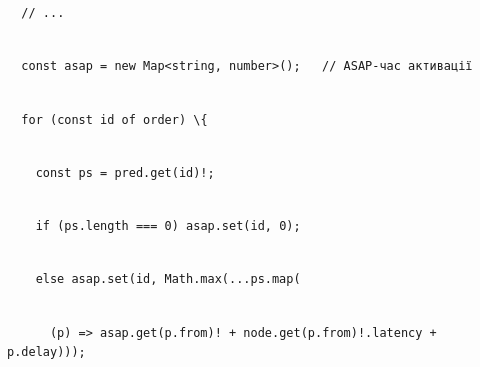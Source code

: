 \documentclass[
]{article}
\newcommand{\passthrough}[1]{#1}
\begin{document}
\passthrough{\lstinline!  !}\passthrough{\lstinline!//!}\passthrough{\lstinline! !}\passthrough{\lstinline!...!}\strut \\
\passthrough{\lstinline!  !}\passthrough{\lstinline!const!}\passthrough{\lstinline! !}\passthrough{\lstinline!asap!}\passthrough{\lstinline! !}\passthrough{\lstinline!=!}\passthrough{\lstinline! !}\passthrough{\lstinline!new!}\passthrough{\lstinline! !}\passthrough{\lstinline!Map<string,!}\passthrough{\lstinline! !}\passthrough{\lstinline!number>();!}\passthrough{\lstinline!   !}\passthrough{\lstinline!//!}\passthrough{\lstinline! !}\passthrough{\lstinline!ASAP-час!}\passthrough{\lstinline! !}\passthrough{\lstinline!активації!}\strut \\
\passthrough{\lstinline!  !}\passthrough{\lstinline!for!}\passthrough{\lstinline! !}\passthrough{\lstinline!(const!}\passthrough{\lstinline! !}\passthrough{\lstinline!id!}\passthrough{\lstinline! !}\passthrough{\lstinline!of!}\passthrough{\lstinline! !}\passthrough{\lstinline!order)!}\passthrough{\lstinline! !}\passthrough{\lstinline!\{!}\strut \\
\passthrough{\lstinline!    !}\passthrough{\lstinline!const!}\passthrough{\lstinline! !}\passthrough{\lstinline!ps!}\passthrough{\lstinline! !}\passthrough{\lstinline!=!}\passthrough{\lstinline! !}\passthrough{\lstinline!pred.get!}\passthrough{\lstinline"(id)!;"}\strut \\
\passthrough{\lstinline!    !}\passthrough{\lstinline!if!}\passthrough{\lstinline! !}\passthrough{\lstinline!(!}\passthrough{\lstinline!ps.length!}\passthrough{\lstinline! !}\passthrough{\lstinline!===!}\passthrough{\lstinline! !}\passthrough{\lstinline!0)!}\passthrough{\lstinline! !}\passthrough{\lstinline!asap.set!}\passthrough{\lstinline!(id,!}\passthrough{\lstinline! !}\passthrough{\lstinline!0);!}\strut \\
\passthrough{\lstinline!    !}\passthrough{\lstinline!else!}\passthrough{\lstinline! !}\passthrough{\lstinline!asap.set!}\passthrough{\lstinline!(id,!}\passthrough{\lstinline! !}\passthrough{\lstinline!Math.max!}\passthrough{\lstinline!(...!}\passthrough{\lstinline!ps.map!}\passthrough{\lstinline!(!}\strut \\
\passthrough{\lstinline!      !}\passthrough{\lstinline!(p)!}\passthrough{\lstinline! !}\passthrough{\lstinline!=>!}\passthrough{\lstinline! !}\passthrough{\lstinline!asap.get!}\passthrough{\lstinline!(!}\passthrough{\lstinline!p.from!}\passthrough{\lstinline")!"}\passthrough{\lstinline! !}\passthrough{\lstinline!+!}\passthrough{\lstinline! !}\passthrough{\lstinline!node.get!}\passthrough{\lstinline!(!}\passthrough{\lstinline!p.from!}\passthrough{\lstinline")!.latency"}\passthrough{\lstinline! !}\passthrough{\lstinline!+!}\passthrough{\lstinline! !}\passthrough{\lstinline!p.delay!}\passthrough{\lstinline!)));!}\strut \\
\end{document}
